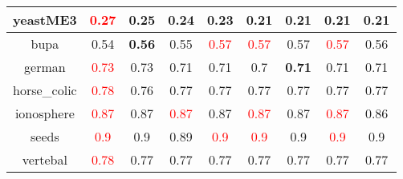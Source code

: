 \documentclass{article}%
\begin{document}
\begin{tabular}{c|cccccccc}
\hline%
yeastME3&\textcolor{red}{ 
0.27
}&0.25&\textbf{0.24}&0.23&0.21&0.21&0.21&0.21\\%
\hline%
bupa&0.54&\textbf{0.56}&0.55&\textcolor{red}{ 
0.57
}&\textcolor{red}{ 
0.57
}&0.57&\textcolor{red}{ 
0.57
}&0.56\\%
\hline%
german&\textcolor{red}{ 
0.73
}&0.73&0.71&0.71&0.7&\textbf{0.71}&0.71&0.71\\%
\hline%
horse\_colic&\textcolor{red}{ 
0.78
}&0.76&0.77&0.77&0.77&0.77&0.77&0.77\\%
\hline%
ionosphere&\textcolor{red}{ 
0.87
}&0.87&\textcolor{red}{ 
0.87
}&0.87&\textcolor{red}{ 
0.87
}&0.87&\textcolor{red}{ 
0.87
}&0.86\\%
\hline%
seeds&\textcolor{red}{ 
0.9
}&0.9&0.89&\textcolor{red}{ 
0.9
}&\textcolor{red}{ 
0.9
}&0.9&\textcolor{red}{ 
0.9
}&0.9\\%
\hline%
vertebal&\textcolor{red}{ 
0.78
}&0.77&0.77&0.77&0.77&0.77&0.77&0.77\\%
\hline%
\end{tabular}

%
\end{document}
